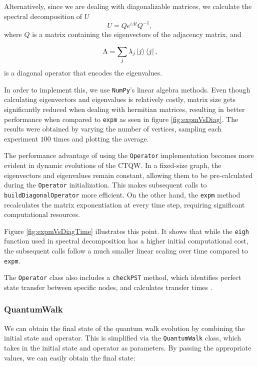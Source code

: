 \documentclass[../../dissertation.tex]{subfiles}
\begin{document}
Alternatively, since we are dealing with diagonalizable matrices, we calculate
the spectral decomposition of $U$
\begin{equation}
    U = Q e^{i\Lambda t} Q^{-1} ,
\end{equation}
where $Q$ is a matrix containing the eigenvectors of the adjacency matrix, and 

\begin{equation}
    \Lambda = \sum_{j} \lambda_j \ket{j}\bra{j},
\end{equation}
is a diagonal operator that encodes the eigenvalues. 

In order to implement this, we use \texttt{NumPy}'s linear algebra methods.
Even though calculating eigenvectors and eigenvalues is relatively costly,
matrix size gets significantly reduced when dealing with hermitian matrices,
resulting in better performance when compared to \texttt{expm} as seen in
figure \ref{fig:expmVsDiag}. The results were obtained by varying the number of
vertices, sampling each experiment $100$ times and plotting the average.\par

The performance advantage of using the \texttt{Operator} implementation becomes
more evident in dynamic evolutions of the CTQW. In a fixed-size graph, the
eigenvectors and eigenvalues remain constant, allowing them to be
pre-calculated during the \texttt{Operator} initialization. This makes
subsequent calls to \texttt{buildDiagonalOperator} more efficient. On the
other hand, the \texttt{expm} method recalculates the matrix exponentiation at
every time step, requiring significant computational resources.\par

Figure \ref{fig:expmVsDiagTime} illustrates this point. It shows that while the
\texttt{eigh} function used in spectral decomposition has a higher initial
computational cost, the subsequent calls follow a much smaller linear
scaling over time compared to \texttt{expm}.\par 

The \texttt{Operator} class also includes a \texttt{checkPST} method, which
identifies perfect state transfer between specific nodes, and calculates
transfer times \cite{coutinho17}.

\subsubsection{QuantumWalk}
We can obtain the final state of the quantum walk evolution by combining the
initial state and operator. This is simplified via the
\texttt{QuantumWalk} class, which takes in the initial state and operator as
parameters. By passing the appropriate values, we can easily obtain the
final state:
\end{document}
